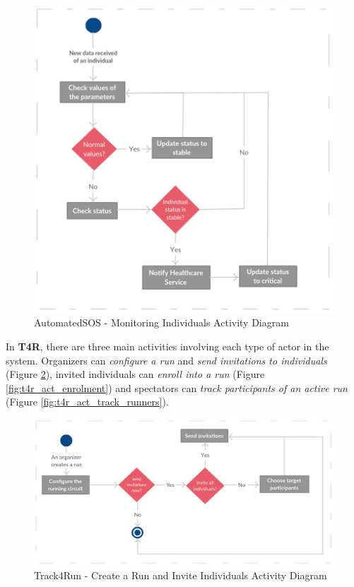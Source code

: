 \documentclass[a4paper, hidelinks, 12pt]{report}
\begin{document}
	\begin{figure}[H]
		\centering
		\includegraphics[width=1\textwidth]{Diagrams/asos_activity_diagram.png}
		\caption[AutomatedSOS - Monitoring Individuals Activity Diagram]{AutomatedSOS - Monitoring Individuals Activity Diagram}
		\label{fig:asos_act_monitoring}
	\end{figure}
	
	In \textbf{T4R}, there are three main activities involving each type of actor in the system. Organizers can \textit{configure a run} and \textit{send invitations to individuals} (Figure \ref{fig:t4r_act_create_run}), invited individuals can \textit{enroll into a run} (Figure \ref{fig:t4r_act_enrolment}) and spectators can \textit{track participants of an active run} (Figure \ref{fig:t4r_act_track_runners}).
	
	\begin{figure}[H]
		\centering
		\includegraphics[width=1\textwidth]{Diagrams/t4r_create_run_activity_diagram.png}
		\caption[Track4Run - Create a Run and Invite Individuals  Activity Diagram]{Track4Run - Create a Run and Invite Individuals Activity Diagram}
		\label{fig:t4r_act_create_run}
	\end{figure}
	
\end{document}
